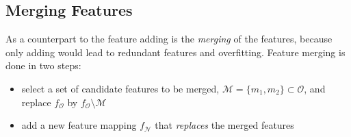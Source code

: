 \documentclass[a4paper,twocolumn]{article}
\newcommand{\N}{\mathcal{N}}
\renewcommand{\O}{\mathcal{O}}
\begin{document}

\subsection{Merging Features}
As a counterpart to the feature adding is the \textit{merging} of the features, because only adding would lead to redundant features and overfitting.
Feature merging is done in two steps:
\begin{itemize}
    \item select a set of candidate features to be merged, $\mathcal{M} = \{m_1, m_2\} \subset \O$, and replace $f_\O$ by $f_\O \setminus \mathcal{M}$
    \item add a new feature mapping $f_\N$ that \textit{replaces} the merged features
\end{itemize}
\end{document}
